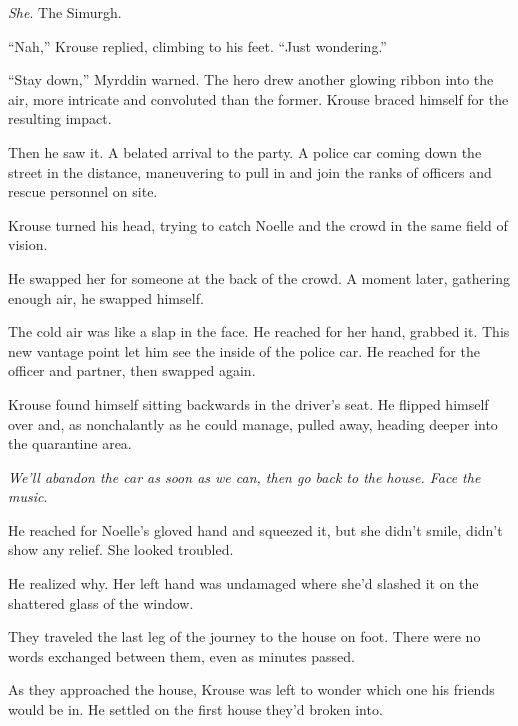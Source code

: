 \emph{She}.  The Simurgh.



``Nah,'' Krouse replied, climbing to his feet.  ``Just wondering.''



``Stay down,'' Myrddin warned.  The hero drew another glowing ribbon into the air, more intricate and convoluted than the former.  Krouse braced himself for the resulting impact.



Then he saw it.  A belated arrival to the party.  A police car coming down the street in the distance, maneuvering to pull in and join the ranks of officers and rescue personnel on site.



Krouse turned his head, trying to catch Noelle and the crowd in the same field of vision.



He swapped her for someone at the back of the crowd.  A moment later, gathering enough air, he swapped himself.



The cold air was like a slap in the face.  He reached for her hand, grabbed it.  This new vantage point let him see the inside of the police car.  He reached for the officer and partner, then swapped again.



Krouse found himself sitting backwards in the driver's seat.  He flipped himself over and, as nonchalantly as he could manage, pulled away, heading deeper into the quarantine area.



\emph{We'll abandon the car as soon as we can, then go back to the house.  Face the music}.



He reached for Noelle's gloved hand and squeezed it, but she didn't smile, didn't show any relief.  She looked troubled.



He realized why.  Her left hand was undamaged where she'd slashed it on the shattered glass of the window.



\sectionbreak



They traveled the last leg of the journey to the house on foot.  There were no words exchanged between them, even as minutes passed.



As they approached the house, Krouse was left to wonder which one his friends would be in.  He settled on the first house they'd broken into.



